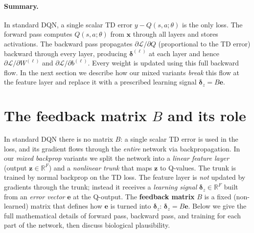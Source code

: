 \documentclass[11pt]{article}
\begin{document}
\paragraph{Summary.} In standard DQN, a single scalar TD error $y - Q(s,a;\theta)$ is the only loss. The forward pass computes $Q(s,a;\theta)$ from $\mathbf{x}$ through all layers and stores activations. The backward pass propagates $\partial \mathcal{L}/\partial Q$ (proportional to the TD error) backward through every layer, producing $\boldsymbol{\delta}^{(\ell)}$ at each layer and hence $\partial \mathcal{L} / \partial W^{(\ell)}$ and $\partial \mathcal{L} / \partial b^{(\ell)}$. Every weight is updated using this full backward flow. In the next section we describe how our mixed variants \emph{break} this flow at the feature layer and replace it with a prescribed learning signal $\boldsymbol{\delta}_z = B\mathbf{e}$.

\section{The feedback matrix $B$ and its role}

In standard DQN there is no matrix $B$: a single scalar TD error is used in the loss, and its gradient flows through the \emph{entire} network via backpropagation. In our \emph{mixed backprop} variants we split the network into a \emph{linear feature layer} (output $\mathbf{z} \in \mathbb{R}^F$) and a \emph{nonlinear trunk} that maps $\mathbf{z}$ to Q-values. The trunk is trained by normal backprop on the TD loss. The feature layer is \emph{not} updated by gradients through the trunk; instead it receives a \emph{learning signal} $\boldsymbol{\delta}_z \in \mathbb{R}^F$ built from an \emph{error vector} $\mathbf{e}$ at the Q-output. The \textbf{feedback matrix} $B$ is a fixed (non-learned) matrix that defines how $\mathbf{e}$ is turned into $\boldsymbol{\delta}_z$: $\boldsymbol{\delta}_z = B \mathbf{e}$. Below we give the full mathematical details of forward pass, backward pass, and training for each part of the network, then discuss biological plausibility.
\end{document}
